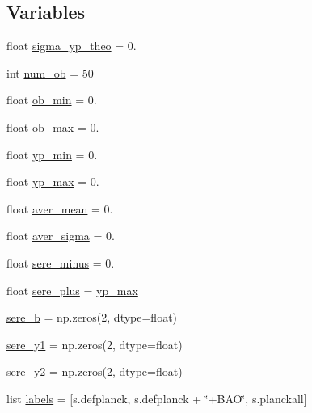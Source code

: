 \subsection*{Variables}
\begin{DoxyCompactItemize}
\item 
float \mbox{\hyperlink{namespacebbn__yhe_a06123892f977e5e00eb0e7bcf6866dbb}{sigma\+\_\+yp\+\_\+theo}} = 0.
\item 
int \mbox{\hyperlink{namespacebbn__yhe_a3aa1ae9b0ed6bd135e4fc002b7eca1a9}{num\+\_\+ob}} = 50
\item 
float \mbox{\hyperlink{namespacebbn__yhe_aa005d4473664db0db345095282beb1ef}{ob\+\_\+min}} = 0.
\item 
float \mbox{\hyperlink{namespacebbn__yhe_a7ad9cbb8dc27628c6fbf6296bba963ca}{ob\+\_\+max}} = 0.
\item 
float \mbox{\hyperlink{namespacebbn__yhe_a624706ed018b5d06d3e1ceea58a08e12}{yp\+\_\+min}} = 0.
\item 
float \mbox{\hyperlink{namespacebbn__yhe_a1b95d70c9d6b84360f839ed708b14c72}{yp\+\_\+max}} = 0.
\item 
float \mbox{\hyperlink{namespacebbn__yhe_a9d5e61e6f78e3497a8c5fce8daedf276}{aver\+\_\+mean}} = 0.
\item 
float \mbox{\hyperlink{namespacebbn__yhe_af08345da95d7b1ecff384b5ca5648a03}{aver\+\_\+sigma}} = 0.
\item 
float \mbox{\hyperlink{namespacebbn__yhe_ad00e51b24c6c009e64a8baa0f0b51ad8}{sere\+\_\+minus}} = 0.
\item 
float \mbox{\hyperlink{namespacebbn__yhe_a8c95d448cd274ce585cfaf255bd4ff1b}{sere\+\_\+plus}} = \mbox{\hyperlink{namespacebbn__yhe_a1b95d70c9d6b84360f839ed708b14c72}{yp\+\_\+max}}
\item 
\mbox{\hyperlink{namespacebbn__yhe_a0189ca7d3d30cadc352fe3c5f419d73a}{sere\+\_\+b}} = np.\+zeros(2, dtype=\textquotesingle{}float\textquotesingle{})
\item 
\mbox{\hyperlink{namespacebbn__yhe_a113b4f8c034ac6ea013657ba051687e1}{sere\+\_\+y1}} = np.\+zeros(2, dtype=\textquotesingle{}float\textquotesingle{})
\item 
\mbox{\hyperlink{namespacebbn__yhe_a5df6de601295fe7e1b92a79b727ccbc3}{sere\+\_\+y2}} = np.\+zeros(2, dtype=\textquotesingle{}float\textquotesingle{})
\item 
list \mbox{\hyperlink{namespacebbn__yhe_a90f26535b1262c9980ba8f8dea539709}{labels}} = \mbox{[}s.\+defplanck, s.\+defplanck + \char`\"{}+B\+AO\char`\"{}, s.\+planckall\mbox{]}

\end{DoxyCompactItemize}
